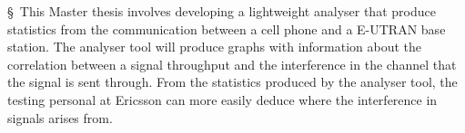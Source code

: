 \documentclass [cropmarks, frame, english, master]{idaexhibitpage}
\author {Paul Nedstrand \& Razmus Lindgren}
\begin{document}
\exhibitpagebeforeabstract 
\S  \ This Master thesis involves developing a lightweight analyser that produce statistics from the communication between a cell phone and a E-UTRAN base station. The analyser tool will produce graphs with information about the correlation between a signal throughput and the interference in the channel that the signal is sent through. From the statistics produced by the analyser tool, the testing personal at Ericsson can more easily deduce where the interference in signals arises from. 
\exhibitpageafterabstract 
\end{document}
